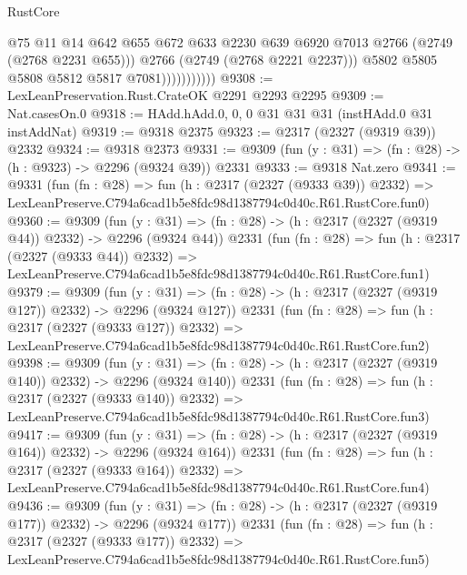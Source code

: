 \begin{lexlean}{RustCore}
\begin{coremodule}
                              @75
                              @11
                              @14
                              @642
                              @655
                              @672
                              @633
                              @2230
                              @639
                              @6920
                              @7013
                              @2766
                              (@2749 (@2768 @2231 @655)))
                            @2766
                            (@2749 (@2768 @2221 @2237)))
                          @5802
                          @5805
                          @5808
                          @5812
                          @5817
                          @7081)))))))))))
@9308 := LexLeanPreservation.Rust.CrateOK @2291 @2293 @2295
@9309 := Nat.casesOn.{0}
@9318 := HAdd.hAdd.{0, 0, 0} @31 @31 @31 (instHAdd.{0} @31 instAddNat)
@9319 := @9318 @2375
@9323 := @2317 (@2327 (@9319 @39)) @2332
@9324 := @9318 @2373
@9331 := @9309 (fun (y : @31) => (fn : @28) -> (h : @9323) -> @2296 (@9324 @39)) @2331
@9333 := @9318 Nat.zero
@9341 := @9331
    (fun (fn : @28) =>
    fun (h : @2317 (@2327 (@9333 @39)) @2332) =>
    LexLeanPreserve.C794a6cad1b5e8fdc98d1387794c0d40c.R61.RustCore.fun0)
@9360 := @9309
    (fun (y : @31) => (fn : @28) -> (h : @2317 (@2327 (@9319 @44)) @2332) -> @2296 (@9324 @44))
    @2331
    (fun (fn : @28) =>
    fun (h : @2317 (@2327 (@9333 @44)) @2332) =>
    LexLeanPreserve.C794a6cad1b5e8fdc98d1387794c0d40c.R61.RustCore.fun1)
@9379 := @9309
    (fun (y : @31) => (fn : @28) -> (h : @2317 (@2327 (@9319 @127)) @2332) -> @2296 (@9324 @127))
    @2331
    (fun (fn : @28) =>
    fun (h : @2317 (@2327 (@9333 @127)) @2332) =>
    LexLeanPreserve.C794a6cad1b5e8fdc98d1387794c0d40c.R61.RustCore.fun2)
@9398 := @9309
    (fun (y : @31) => (fn : @28) -> (h : @2317 (@2327 (@9319 @140)) @2332) -> @2296 (@9324 @140))
    @2331
    (fun (fn : @28) =>
    fun (h : @2317 (@2327 (@9333 @140)) @2332) =>
    LexLeanPreserve.C794a6cad1b5e8fdc98d1387794c0d40c.R61.RustCore.fun3)
@9417 := @9309
    (fun (y : @31) => (fn : @28) -> (h : @2317 (@2327 (@9319 @164)) @2332) -> @2296 (@9324 @164))
    @2331
    (fun (fn : @28) =>
    fun (h : @2317 (@2327 (@9333 @164)) @2332) =>
    LexLeanPreserve.C794a6cad1b5e8fdc98d1387794c0d40c.R61.RustCore.fun4)
@9436 := @9309
    (fun (y : @31) => (fn : @28) -> (h : @2317 (@2327 (@9319 @177)) @2332) -> @2296 (@9324 @177))
    @2331
    (fun (fn : @28) =>
    fun (h : @2317 (@2327 (@9333 @177)) @2332) =>
    LexLeanPreserve.C794a6cad1b5e8fdc98d1387794c0d40c.R61.RustCore.fun5)

\end{coremodule}
\end{lexlean}

